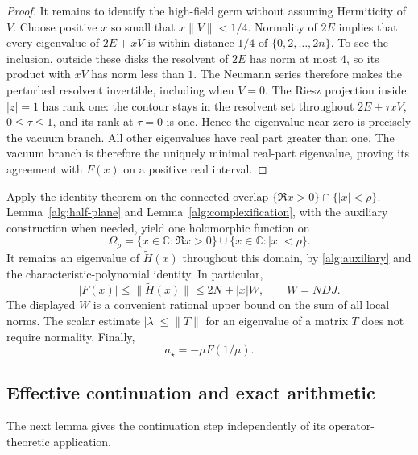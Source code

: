 \documentclass[reqno]{amsart}
\theoremstyle{definition}
\theoremstyle{remark}
\newcommand{\C}{\mathbb C}
\begin{document}
\begin{proof}
It remains to identify the high-field germ without assuming
Hermiticity of \(V\).  Choose positive \(x\) so small that
\(x\|V\|<1/4\).
Normality of \(2E\) implies that every eigenvalue of
\(2E+xV\) is within distance \(1/4\) of
\(\{0,2,\ldots,2n\}\).  To see the inclusion, outside these disks
the resolvent of \(2E\) has norm at most \(4\), so its
product with \(xV\) has norm less than \(1\).
The Neumann series therefore makes the perturbed resolvent
invertible, including when \(V=0\).
The Riesz projection inside \(|z|=1\) has rank one:
the contour stays in the resolvent set throughout
\(2E+\tau xV\), \(0\le\tau\le1\), and its rank at \(\tau=0\)
is one.  Hence the eigenvalue near zero is precisely the vacuum
branch.  All other eigenvalues have real part greater than one.
The vacuum branch is therefore the uniquely minimal real-part
eigenvalue, proving its agreement with \(F(x)\) on a positive
real interval.
\end{proof}

Apply the identity theorem on the connected overlap
\(\{\Re x>0\}\cap\{|x|<\rho\}\).
Lemma~\ref{alg:half-plane} and
Lemma~\ref{alg:complexification}, with the auxiliary construction
when needed, yield one holomorphic function on
\begin{equation}
 \Omega_\rho=\{x\in\C:\Re x>0\}\cup\{x\in\C:|x|<\rho\}.
 \label{alg:glued-domain}
\end{equation}
It remains an eigenvalue of \(\widetilde H(x)\) throughout this
domain, by \eqref{alg:auxiliary} and the characteristic-polynomial
identity.  In particular,
\begin{equation}
 |F(x)|\le\|\widetilde H(x)\|
          \le2N+|x|W,\qquad W=NDJ.
 \label{alg:norm-bound}
\end{equation}
The displayed \(W\) is a convenient rational upper bound on the
sum of all local norms.  The scalar estimate
\(|\lambda|\le\|T\|\) for an eigenvalue of a matrix \(T\)
does not require normality.
Finally,
\begin{equation}
 a_\star=-\mu F(1/\mu).
 \label{alg:target}
\end{equation}

\subsection{Effective continuation and exact arithmetic}
\label{alg:continuation-subsection}

The next lemma gives the continuation step independently of its
operator-theoretic application.
\end{document}
